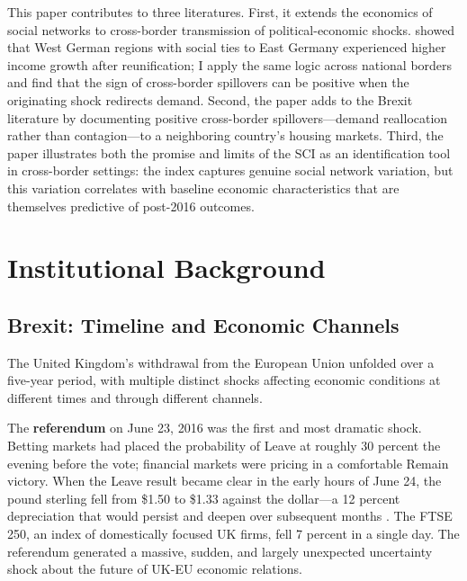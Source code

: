 \documentclass[12pt]{article}
\begin{document}
This paper contributes to three literatures. First, it extends the economics of social networks \citep{rauch2001business, chaney2014network, bailey2018social, bailey2021international} to cross-border transmission of political-economic shocks. \citet{burchardi2013economic} showed that West German regions with social ties to East Germany experienced higher income growth after reunification; I apply the same logic across national borders and find that the sign of cross-border spillovers can be positive when the originating shock redirects demand. Second, the paper adds to the Brexit literature \citep{sampson2017brexit, born2019costs, bloom2025brexit, hassan2024global} by documenting positive cross-border spillovers---demand reallocation rather than contagion---to a neighboring country's housing markets. Third, the paper illustrates both the promise and limits of the SCI as an identification tool in cross-border settings: the index captures genuine social network variation, but this variation correlates with baseline economic characteristics that are themselves predictive of post-2016 outcomes.


\section{Institutional Background}

\subsection{Brexit: Timeline and Economic Channels}

The United Kingdom's withdrawal from the European Union unfolded over a five-year period, with multiple distinct shocks affecting economic conditions at different times and through different channels.

The \textbf{referendum} on June 23, 2016 was the first and most dramatic shock. Betting markets had placed the probability of Leave at roughly 30 percent the evening before the vote; financial markets were pricing in a comfortable Remain victory. When the Leave result became clear in the early hours of June 24, the pound sterling fell from \$1.50 to \$1.33 against the dollar---a 12 percent depreciation that would persist and deepen over subsequent months \citep{born2019costs}. The FTSE 250, an index of domestically focused UK firms, fell 7 percent in a single day. The referendum generated a massive, sudden, and largely unexpected uncertainty shock about the future of UK-EU economic relations.
\end{document}
